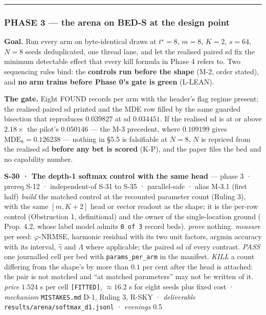 \documentclass[11pt,a4paper]{article}
\theoremstyle{plain}
\theoremstyle{definition}
\theoremstyle{remark}
\begin{document}
\begin{center}\rule{0.5\linewidth}{0.5pt}\end{center}

\subsubsection{PHASE 3 --- the arena on BED-S at the design
point}\label{phase-3-the-arena-on-bed-s-at-the-design-point}

\textbf{Goal.} Run every arm on byte-identical draws at \(t^\star=8\),
\(m=8\), \(K=2\), \(s=64\), \(N=8\) seeds deduplicated, one thread lane,
and let the realised paired sd fix the minimum detectable effect that
every kill formula in Phase 4 refers to. Two sequencing rules bind: the
\textbf{controls run before the shape} (M-2, order stated), and
\textbf{no arm trains before Phase 0's gate is green} (L-LEAN).

\textbf{The gate.} Eight FOUND records per arm with the header's flag
regime present; the realised paired sd printed and the MDE row filled by
the same guarded bisection that reproduces \(0.039827\) at sd
\(0.034451\). If the realised sd is at or above \(2.18\times\) the
pilot's \(0.050146\) --- the M-3 precedent, where \(0.109199\) gives
\(\mathrm{MDE}_8=0.126238\) --- nothing in §5.5 is falsifiable at
\(N=8\), \(N\) is repriced from the realised sd \textbf{before any bet
is scored} (K-P), and the paper files the bed and no capability number.

\textbf{S-30 · The depth-1 softmax control with the same head} --- phase
3 · prereq S-12 · independent-of S-31 to S-35 · parallel-safe · alias
M-3.1 (first half) \emph{build} the matched control at the recounted
parameter count (Ruling 3), with the same \([m,K+2]\) head or vector
readout as the shape; it is the per-row control (Obstruction 1,
definitional) and the owner of the single-location ground
(\citep{duranthon-2026-softmax-advantage} Prop. 4.2, whose label model
admits \texttt{0\ of\ 3} record beds). \emph{prove} nothing.
\emph{measure} per seed: \(\varphi\)-NRMSE, harmonic residual with its
two unit factors, argmin accuracy with its interval, \(\hat\gamma\) and
\(\Lambda\) where applicable; the paired sd of every contrast.
\emph{PASS} one journalled cell per bed with \texttt{params\_per\_arm}
in the manifest. \emph{KILL} a count differing from the shape's by more
than \(0.1\) per cent after the head is attached: the pair is not
matched and ``at matched parameters'' may not be written of it.
\emph{price} \(1.524\) s per cell \texttt{{[}FITTED{]}}, \(\approx16.2\)
s for eight seeds plus fixed cost · \emph{mechanism}
\texttt{MISTAKES.md} D-1, Ruling 3, R-SKY · \emph{deliverable}
\texttt{results/arena/softmax\_d1.jsonl} · \emph{evenings} 0.5
\end{document}
